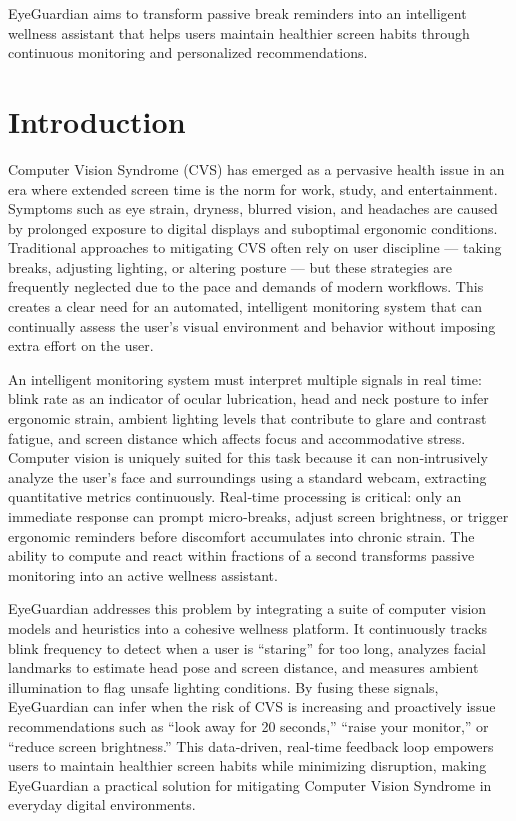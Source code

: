 \documentclass[12pt]{report}
\begin{document}
EyeGuardian aims to transform passive break reminders into an intelligent wellness assistant that helps users maintain healthier screen habits through continuous monitoring and personalized recommendations.


\chapter{Introduction}

Computer Vision Syndrome (CVS) has emerged as a pervasive health issue in an era where extended screen time is the norm for work, study, and entertainment. Symptoms such as eye strain, dryness, blurred vision, and headaches are caused by prolonged exposure to digital displays and suboptimal ergonomic conditions. Traditional approaches to mitigating CVS often rely on user discipline — taking breaks, adjusting lighting, or altering posture — but these strategies are frequently neglected due to the pace and demands of modern workflows. This creates a clear need for an automated, intelligent monitoring system that can continually assess the user’s visual environment and behavior without imposing extra effort on the user.

An intelligent monitoring system must interpret multiple signals in real time: blink rate as an indicator of ocular lubrication, head and neck posture to infer ergonomic strain, ambient lighting levels that contribute to glare and contrast fatigue, and screen distance which affects focus and accommodative stress. Computer vision is uniquely suited for this task because it can non‑intrusively analyze the user’s face and surroundings using a standard webcam, extracting quantitative metrics continuously. Real‑time processing is critical: only an immediate response can prompt micro‑breaks, adjust screen brightness, or trigger ergonomic reminders before discomfort accumulates into chronic strain. The ability to compute and react within fractions of a second transforms passive monitoring into an active wellness assistant.

EyeGuardian addresses this problem by integrating a suite of computer vision models and heuristics into a cohesive wellness platform. It continuously tracks blink frequency to detect when a user is “staring” for too long, analyzes facial landmarks to estimate head pose and screen distance, and measures ambient illumination to flag unsafe lighting conditions. By fusing these signals, EyeGuardian can infer when the risk of CVS is increasing and proactively issue recommendations such as “look away for 20 seconds,” “raise your monitor,” or “reduce screen brightness.” This data‑driven, real‑time feedback loop empowers users to maintain healthier screen habits while minimizing disruption, making EyeGuardian a practical solution for mitigating Computer Vision Syndrome in everyday digital environments.
\end{document}
